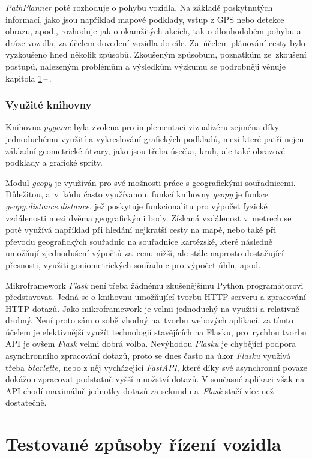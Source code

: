 \documentclass[czech, bachelor]{diploma}
\newcommand{\filipref}[1]{\ref{#1}\,--\,\nameref{#1}}
\begin{document}
\emph{PathPlanner} poté rozhoduje o pohybu vozidla. Na základě poskytnutých informací, jako jsou například mapové podklady, vstup
z GPS nebo detekce obrazu, apod., rozhoduje jak o okamžitých akcích, tak o dlouhodobém pohybu a dráze vozidla, za účelem dovedení
vozidla do cíle. Za~účelem plánování cesty bylo vyzkoušeno hned několik způsobů. Zkoušeným způsobům, poznatkům ze~zkoušení
postupů, nalezeným problémům a výsledkům výzkumu se podrobněji věnuje kapitola \filipref{driving-methods}.

\subsection{Využité knihovny}

Knihovna \emph{pygame} byla zvolena pro implementaci vizualizéru zejména díky jednoduchému využití a vykreslování grafických
podkladů, mezi které patří nejen základní geometrické útvary, jako jsou třeba úsečka, kruh, ale také obrazové podklady a grafické
sprity.

Modul \emph{geopy} je využíván pro své možnosti práce s geografickými souřadnicemi. Důležitou, a~v~kódu často využívanou, funkcí
knihovny \emph{geopy} je funkce \emph{geopy.distance.distance}, jež poskytuje funkcionalitu pro výpočet fyzické vzdálenosti mezi
dvěma geografickými body. Získaná vzdálenost v~metrech se poté využívá například při hledání nejkratší cesty na mapě, nebo také
při převodu geografických souřadnic na souřadnice kartézské, které následně umožňují zjednodušení výpočtů za~cenu nižší, ale stále
naprosto dostačující přesnosti, využití goniometrických souřadnic pro výpočet úhlu, apod.

Mikroframework \emph{Flask} není třeba žádnému zkušenějšímu Python programátorovi představovat. Jedná se o knihovnu umožňující
tvorbu HTTP serveru a zpracování HTTP dotazů. Jako mikroframework je velmi jednoduchý na využití a relativně drobný. Není proto
sám o sobě vhodný na~tvorbu webových aplikací, za tímto účelem je efektivnější využít technologií stavějících na Flasku,
pro~rychlou tvorbu API je ovšem \emph{Flask} velmi dobrá volba. Nevýhodou \emph{Flasku} je chybějící podpora asynchronního
zpracování dotazů, proto se dnes často na úkor \emph{Flasku} využívá třeba \emph{Starlette}, nebo z něj vycházející
\emph{FastAPI}, které díky své asynchronní povaze dokážou zpracovat podstatně vyšší množství dotazů. V současné aplikaci však
na API chodí maximálně jednotky dotazů za sekundu a~\emph{Flask} stačí více než dostatečně.

\chapter{Testované způsoby řízení vozidla} \label{driving-methods}
\end{document}

